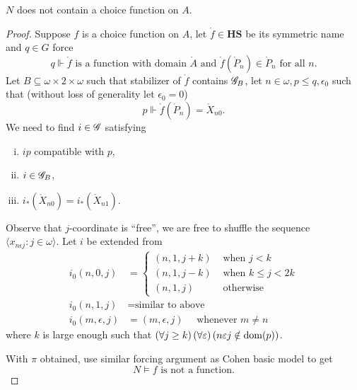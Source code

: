 \begin{theorem}
    \(N\) does not contain a choice function on \(A\).
\end{theorem}
\begin{proof}
Suppose \(f\) is a choice function on \(A\), let \(\mathring{f}\in\mathbf{HS}\) be its symmetric name and \(q\in G\) force
\[q\Vdash \mathring{f}\text{ is a function with domain } \mathring{A} \text{ and } \mathring{f}(\mathring{P}_n) \in \mathring{P}_n\text{ for all }n .\]
Let \(B\subseteq \omega\times2\times\omega\) such that stabilizer of \(\mathring{f}\) contains \(\mathscr{G}_B\),
let \(n\in\omega, p\leq q, \epsilon_0\) such that (without loss of generality let \(\epsilon_0 = 0\))
\[ p\Vdash \mathring{f}(\mathring{P}_n) = \mathring{X}_{n0}. \]
We need to find \(i\in\mathscr{G}\) satisfying
\begin{enumerate}[i.]
    \item \(i p\) compatible with \(p\),
    \item \(i \in \mathscr{G}_B\),
    \item \(i_*(\mathring{X}_{n0}) = i_*(\mathring{X}_{n1})\).
\end{enumerate}
Observe that \(j\)-coordinate is ``free'',
we are free to shuffle the sequence \(\langle x_{n\epsilon j}:j\in\omega\rangle\).
Let \(i\) be extended from
\begin{align*}
    i_0(n,0,j) &=
    \begin{cases}
        (n,1,j+k) &\text{ when } j < k \\
        (n,1,j-k) &\text{ when } k \leq j < 2k \\
        (n,1,j) &\text{ otherwise}
    \end{cases} \\
    i_0(n,1,j) &= \text{similar to above} \\
    i_0(m,\epsilon,j) &= (m,\epsilon,j) \quad\text{ whenever }m \ne n
\end{align*}
where \(k\) is large enough such that \(\left(\forall j\geq k\right)\left(\forall\varepsilon\right)\left(n\varepsilon j \notin \operatorname{dom}(p)\right)\).

With \(\pi\) obtained, use similar forcing argument as Cohen basic model to get
\[ N\models f\text{ is not a function}. \tag*{\qedhere} \]
\end{proof}
